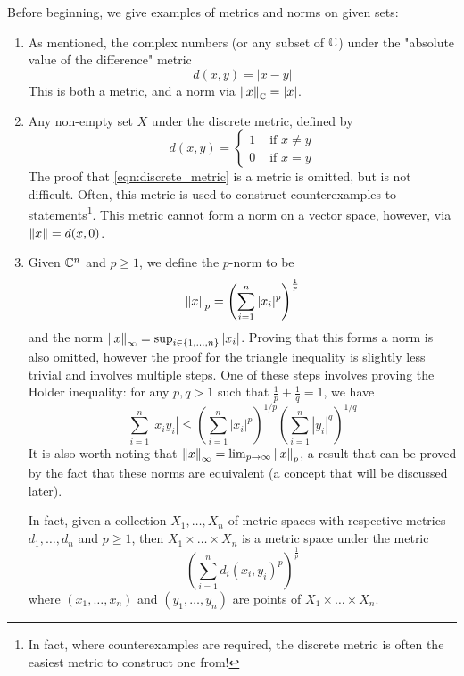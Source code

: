 Before beginning, we give examples of metrics and norms on given sets:
\begin{enumerate}
    \item As mentioned, the complex numbers (or any subset of $\mathbb{C}$) under the "absolute value of the difference" metric \[ d(x,y) = |x-y| \] This is both a metric, and a norm via \mbox{$\left\lVert x \right\rVert_{\mathbb{C}} = |x|$}.
    \item Any non-empty set $X$ under the discrete metric, defined by
        \begin{equation} \label{eqn:discrete_metric}
        d(x,y) = 
        \begin{cases}
            1 & \text{ if } x \neq y \\
            0 & \text{ if } x = y
        \end{cases}
        \end{equation}
        The proof that \eqref{eqn:discrete_metric} is a metric is omitted, but is not difficult. Often, this metric is used to construct counterexamples to statements\footnote{In fact, where counterexamples are required, the discrete metric is often the easiest metric to construct one from!}. This metric cannot form a norm on a vector space, however, via \mbox{$\left\lVert x \right\rVert = d(x,0)$}.
    \item Given $\mathbb{C}^{n}$ and $p\geq 1$, we define the $p$-norm to be
        \begin{equation} \label{eqn:pnorms}
           \left\lVert x \right\rVert_{p} = \left( \sum_{i=1}^{n} |x_{i}|^{p} \right)^{\frac{1}{p}} 
        \end{equation}
        and the norm $\left\lVert x \right\rVert_{\infty} = \sup_{i\in \{1,\ldots, n\}} |x_{i}|$. Proving that this forms a norm is also omitted, however the proof for the triangle inequality is slightly less trivial and involves multiple steps. One of these steps involves proving the Holder inequality: for any $p,q>1$ such that \mbox{$\frac{1}{p} + \frac{1}{q} = 1$,} we have
        \[ \sum_{i=1}^{n} |x_{i} y_{i}| \leq \left( \sum_{i=1}^{n} |x_{i}|^{p} \right)^{1/p} \left( \sum_{i=1}^{n} |y_{i}|^{q} \right)^{1/q} \]
        It is also worth noting that $\left\lVert x \right\rVert_{\infty} = \lim_{p\to\infty} \left\lVert x \right\rVert_{p}$, a result that can be proved by the fact that these norms are equivalent (a concept that will be discussed later).
        
        In fact, given a collection \mbox{$X_{1},\ldots,X_{n}$} of metric spaces with respective metrics \mbox{$d_{1},\ldots,d_{n}$} and $p\geq 1$, then \mbox{$X_{1} \times \ldots \times X_{n}$} is a metric space under the metric \[ \left( \sum_{i=1}^{n} d_{i}(x_{i},y_{i})^{p} \right)^{\frac{1}{p}} \] where \mbox{$(x_{1},\ldots,x_{n})$} and \mbox{$(y_{1},\ldots, y_{n})$} are points of \mbox{$X_{1} \times \ldots \times X_{n}$.}
        

\end{enumerate}
